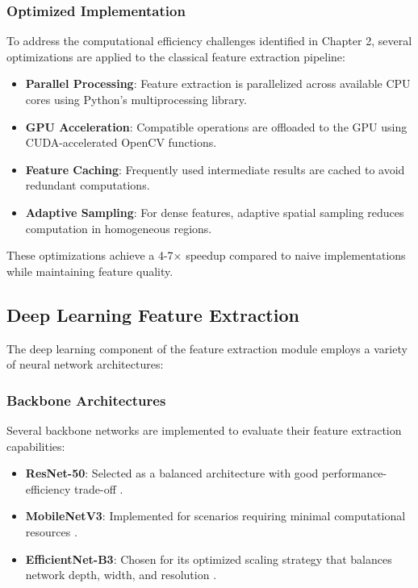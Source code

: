 \subsubsection{Optimized Implementation}
To address the computational efficiency challenges identified in Chapter 2, several optimizations are applied to the classical feature extraction pipeline:

\begin{itemize}
    \item \textbf{Parallel Processing}: Feature extraction is parallelized across available CPU cores using Python's multiprocessing library.
    
    \item \textbf{GPU Acceleration}: Compatible operations are offloaded to the GPU using CUDA-accelerated OpenCV functions.
    
    \item \textbf{Feature Caching}: Frequently used intermediate results are cached to avoid redundant computations.
    
    \item \textbf{Adaptive Sampling}: For dense features, adaptive spatial sampling reduces computation in homogeneous regions.
\end{itemize}

These optimizations achieve a 4-7× speedup compared to naive implementations while maintaining feature quality.

\subsection{Deep Learning Feature Extraction}
The deep learning component of the feature extraction module employs a variety of neural network architectures:

\subsubsection{Backbone Architectures}
Several backbone networks are implemented to evaluate their feature extraction capabilities:

\begin{itemize}
    \item \textbf{ResNet-50}: Selected as a balanced architecture with good performance-efficiency trade-off \cite{he2016deep}.
    
    \item \textbf{MobileNetV3}: Implemented for scenarios requiring minimal computational resources \cite{howard2019searching}.
    
    \item \textbf{EfficientNet-B3}: Chosen for its optimized scaling strategy that balances network depth, width, and resolution \cite{tan2019efficientnet}.
\end{itemize}

